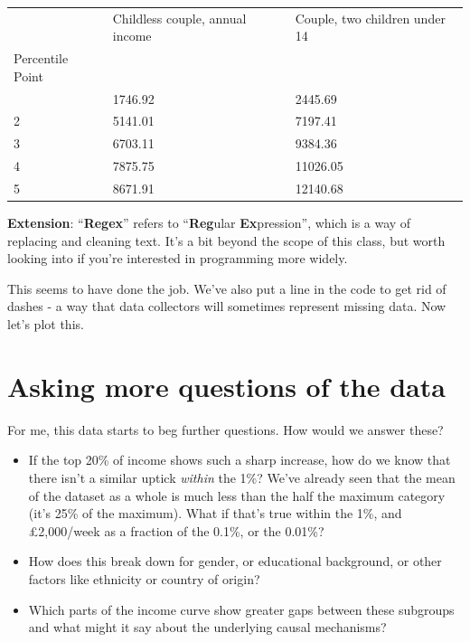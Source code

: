 \documentclass[
  letterpaper,
  DIV=11,
  numbers=noendperiod]{scrreprt}
\begin{document}
\begin{longtable}[]{@{}lll@{}}
\toprule\noalign{}
& Childless couple, annual income & Couple, two children under 14 \\
Percentile Point & & \\
\midrule\noalign{}
\endhead
\bottomrule\noalign{}
\endlastfoot
1 & 1746.92 & 2445.69 \\
2 & 5141.01 & 7197.41 \\
3 & 6703.11 & 9384.36 \\
4 & 7875.75 & 11026.05 \\
5 & 8671.91 & 12140.68 \\
\end{longtable}

\textbf{Extension}: ``\textbf{Regex}'' refers to ``\textbf{Reg}ular
\textbf{Ex}pression'', which is a way of replacing and cleaning text.
It's a bit beyond the scope of this class, but worth looking into if
you're interested in programming more widely.

This seems to have done the job. We've also put a line in the code to
get rid of dashes - a way that data collectors will sometimes represent
missing data. Now let's plot this.

\hypertarget{asking-more-questions-of-the-data}{%
\section{Asking more questions of the
data}\label{asking-more-questions-of-the-data}}

For me, this data starts to beg further questions. How would we answer
these?

\begin{itemize}
\item
  If the top 20\% of income shows such a sharp increase, how do we know
  that there isn't a similar uptick \emph{within} the 1\%? We've already
  seen that the mean of the dataset as a whole is much less than the
  half the maximum category (it's 25\% of the maximum). What if that's
  true within the 1\%, and £2,000/week as a fraction of the 0.1\%, or
  the 0.01\%?
\item
  How does this break down for gender, or educational background, or
  other factors like ethnicity or country of origin?
\item
  Which parts of the income curve show greater gaps between these
  subgroups and what might it say about the underlying causal
  mechanisms?
\end{itemize}
\end{document}
